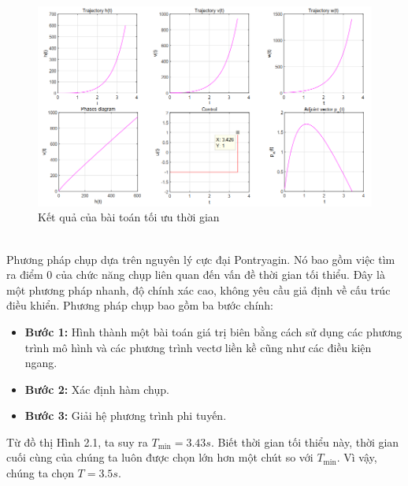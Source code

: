 \documentclass[12pt,a4paper]{report}
\begin{document}
\begin{figure} [h]
	\centering
	\includegraphics[scale=.6]{./image/hinh1.png}
	\caption{Kết quả của bài toán tối ưu thời gian}
\end{figure}
\\Phương pháp chụp dựa trên nguyên lý cực đại Pontryagin. Nó bao gồm việc tìm ra điểm 0 của chức năng chụp liên quan đến vấn đề thời gian tối thiểu. Đây là một phương pháp nhanh, độ chính xác cao, không yêu cầu giả định về cấu trúc điều khiển. Phương pháp chụp bao gồm ba bước chính:
\begin{itemize}
	\item \textbf{Bước 1:}
	Hình thành một bài toán giá trị biên bằng cách sử dụng các phương trình mô hình và các phương trình vectơ liền kề cũng như các điều kiện ngang.
	\item \textbf{Bước 2:}
	Xác định hàm chụp.
	\item \textbf{Bước 3:}
	Giải hệ phương trình phi tuyến.
\end{itemize}
Từ đồ thị Hình 2.1, ta suy ra $T_{\min} = 3.43s$. Biết thời gian tối thiểu này, thời gian cuối cùng của chúng ta luôn được chọn lớn hơn một chút so với $T_{\min}$. Vì vậy, chúng ta chọn $T = 3.5s$.
\end{document}
